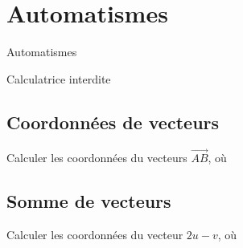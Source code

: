 
\AdvanceDate[1]



\section{Automatismes}

\begin{frame}

\centering \huge
Automatismes

\large
Calculatrice interdite

\end{frame}

\subsection{Coordonnées de vecteurs}

\begin{frame}{1}	
	Calculer les coordonnées du vecteurs $\overrightarrow{AB}$, où
\end{frame}

\subsection{Somme de vecteurs}

\begin{frame}{2}	

	Calculer les coordonnées du vecteur $2u - v$, où
	
\end{frame}

